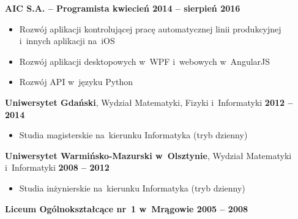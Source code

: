 \documentclass[11pt,a4paper]{article}
\newcommand*\header[1]{
    \noindent\raisebox{.1cm}{\color{MidnightBlue}\rule{1.5cm}{.1cm}\hspace{.2cm}\raisebox{-.1cm}{\large\bf #1}}}
\begin{document}
    \vspace{-.17cm}

    {\bf AIC S.A. -- Programista \hfill kwiecień 2014 -- sierpień 2016}

    \vspace{-.23cm}
    \begin{itemize}[leftmargin=1.5cm] \itemsep.2mm \parskip0mm 
        \item Rozwój aplikacji kontrolującej pracę automatycznej linii produkcyjnej i~innych aplikacji na~iOS
        \item Rozwój aplikacji desktopowych w~WPF i~webowych w~AngularJS
        \item Rozwój API w~języku Python
    \end{itemize}


    \medskip
  
    \header{Edukacja}
  
    \smallskip

    {{\bf Uniwersytet Gdański}, Wydział Matematyki, Fizyki i~Informatyki \hfill {\bf 2012 -- 2014}}

    \vspace{-.23cm}
    \begin{itemize}[leftmargin=1.5cm] \itemsep.2mm \parskip0mm 
        \item[ ] Studia magisterskie na~kierunku Informatyka (tryb dzienny)
    \end{itemize}

    \vspace{-.17cm}

    {{\bf Uniwersytet Warmińsko-Mazurski w~Olsztynie}, Wydział Matematyki i~Informatyki
        \hfill {\bf 2008 -- 2012}}

    \vspace{-.23cm}
    \begin{itemize}[leftmargin=1.5cm] \itemsep.2mm \parskip0mm 
        \item[ ] Studia inżynierskie na~kierunku Informatyka (tryb dzienny)
    \end{itemize}

    \vspace{-.17cm}

    {\bf Liceum Ogólnokształcące nr~1 w~Mrągowie \hfill 2005 -- 2008}
\end{document}
